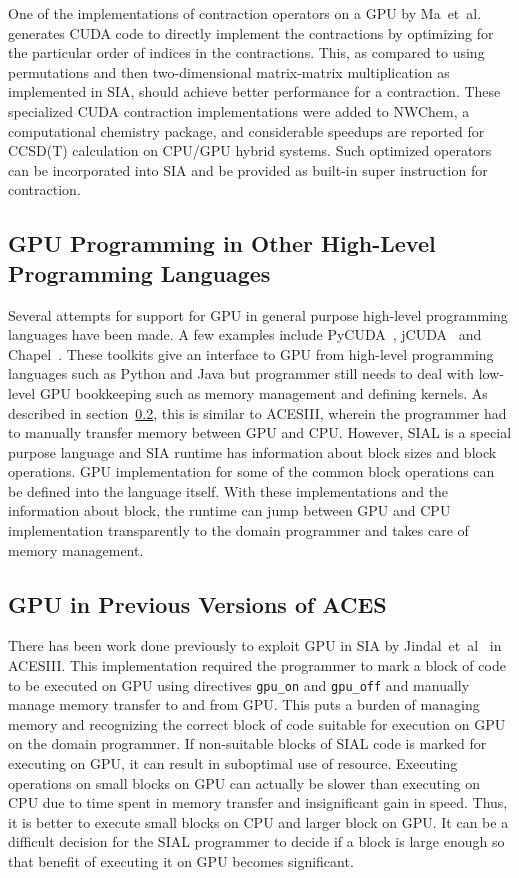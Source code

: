 One of the implementations of contraction operators on a GPU by
Ma~et~al.~\cite{Ma2013} generates CUDA code to directly implement the contractions
by optimizing for the particular order of indices in the contractions. This, as
compared to using permutations and then two-dimensional matrix-matrix multiplication
as implemented in SIA, should achieve better performance for a contraction. These
specialized CUDA contraction implementations were added to NWChem, a computational
chemistry package, and considerable speedups are reported for CCSD(T) calculation
on CPU/GPU hybrid systems. Such optimized operators can be incorporated into SIA
and be provided as built-in super instruction for contraction.

\subsection{GPU Programming in Other High-Level Programming Languages}
Several attempts for support for GPU in general purpose high-level programming
languages have been made. A few examples include PyCUDA~\cite{pycuda2011},
jCUDA~\cite{jcuda2009} and Chapel~\cite{chapelgpu}. These toolkits give an interface
to GPU from high-level programming languages such as Python and Java but
programmer still needs to deal with low-level GPU bookkeeping such as memory
management and defining kernels. As described in section~\ref{relatedworkacesiiigpu},
this is similar to ACESIII, wherein the programmer had to manually transfer memory
between GPU and CPU. However, SIAL is a special purpose language and SIA runtime
has information about block sizes and block operations. GPU implementation for
some of the common block operations can be defined into the language itself. With
these implementations and the information about block, the runtime can jump between
GPU and CPU implementation transparently to the domain programmer and takes care
of memory management.

\subsection{GPU in Previous Versions of ACES}\label{relatedworkacesiiigpu}
There has been work done previously to exploit GPU in SIA
by Jindal~et~al~\cite{Jindal2016} in ACESIII. This implementation
required the programmer to mark a block of code to be executed on GPU using
directives \texttt{gpu\_on} and \texttt{gpu\_off} and manually manage memory
transfer to and from GPU. This puts a burden of managing memory and recognizing
the correct block of code suitable for execution on GPU on the domain programmer.
If non-suitable blocks of SIAL code is marked for executing on GPU, it can result
in suboptimal use of resource. Executing operations on small blocks on GPU can
actually be slower than executing on CPU due to time spent in memory transfer and
insignificant gain in speed. Thus, it is better to execute small blocks on CPU and
larger block on GPU. It can be a difficult decision for the SIAL programmer to decide
if a block is large enough so that benefit of executing it on GPU becomes significant.

